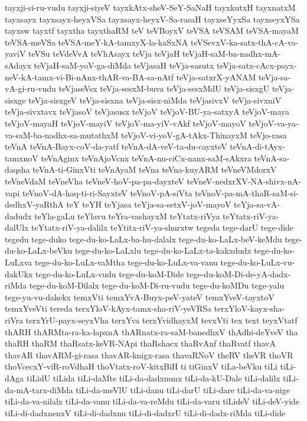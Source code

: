 {tayxji-si-ru-vudu
tayxji-siyeV
tayxkAtx-sheV-SeY-SaNaH
tayxkutxH
tayxnatxM
tayxsayx
tayxsayx-heyxVSa
tayxsayx-heyxV-Sa-rasaH
tayxseYyxSa
tayxseyxYSa
tayxsw
tayxtf
tayxtha
tayxthaRM
teV
teVBoyxV
teVSA
teVSAM
teVSA-mayaM
teVSA-meVSa
teVSA-meY-kA-tamxyX-la-kaSxNA
teVSevxV-ka-satx-thA-cA-va-yaviV
teVSu
teVdeVvA
teVhAsayx
teVja
teVjaH
teVjaH-saM-ba-nadhx-mA-sAdayx
teVjaH-saM-yoV-ga-diMda
teVjasaH
teVja-sasutx
teVja-satx-cAcx-payx-neV-kA-tamx-vi-Bi-nAnx-thAR-va-BA-sa-nAtf
teVja-satxrX-yANAM
teVja-sa-vA-gi-ru-vudu
teVjaseVsx
teVja-sesxM-buva
teVja-sesxMdU
teVja-sisxgU
teVja-sisxge
teVja-sisxgeV
teVja-sisxna
teVja-sisx-niMda
teVjasivxV
teVja-sivxniV
teVja-sivxtavx
teVjasoV
teVjasusx
teVjoV
teVjoV-BU-ya-satxyA
teVjoV-maya
teVjoV-mayaH
teVjoV-mayiV
teVjoV-ma-yiV-vAkf
teVjoV-mayoV
teVjoV-va-ya-va-saM-ba-nadhx-sa-mutathxM
teVjoV-vi-yoV-gA-tAkx-ThinayxM
teVjo-rasa
teVnA
teVnA-Bayx-coV-da-yatf
teVnA-dA-veV-ta-du-cayxteV
teVnA-di-tAyx-tamxnoV
teVnAginx
teVnAjoVcnx
teVnA-nu-ciCx-nanx-saM-sAkxra
teVnA-sa-daqsha
teVnA-ti-GinxVti
teVnAyaM
teVna
teVna-kuyARM
teVneVMdorxV
teVneVdaM
teVneVha
teVneV-hoV-pa-pa-dayxteV
teVneV-nedxrXV-NA-shivx-nA-vapi
teVnoV-dA-haq-ti-ri-SayxteV
teVnoV-pA-siVta
teVnoV-pa-mA-thaR-saM-si-dedhxV-yaRthA
teY
teYH
teYjasa
teYja-sa-setxV-joV-mayoV
teYja-sa-vA-dadudx
teYla-gaLu
teYlavu
teYra-vashayxM
teYtatx-riVya
teYtatx-riV-ya-dalUlx
teYtatx-riV-ya-dalilx
teYtitx-riV-ya-shurxtw
tegeda
tege-darU
tege-dide
tegedu
tege-duko
tege-du-ko-LaLx-ba-hu-dalalx
tege-du-ko-LaLx-beV-keMdu
tege-du-ko-LaLx-beVku
tege-du-ko-LaLxlu
tege-du-ko-LaLx-ta-kakxdudx
tege-du-ko-LuLxva
tege-du-ko-LuLx-vaMtha
tege-du-ko-LuLx-va-vanu
tege-du-ko-LuLx-vu-dakUkx
tege-du-ko-LuLx-vudu
tege-du-koM-Dide
tege-du-koM-Di-de-yA-dadx-riMda
tege-du-koM-Dilalx
tege-du-koM-Di-ru-vudu
tege-du-koMDu
tege-yalu
tege-yu-vu-dakekx
temxVti
temxYvA-Buyx-peV-yateV
temxYveV-tayxtoV
temxYveVti
tereda
terxYloV-kAyx-tamx-sha-riV-yeVRSa
terxYloV-kayx-sha-riVra
terxYrU-payx-seyxVha
terxYva
terxYvidhayxM
tevxVti
tex
text
teyxVtatf
thARH
thARMta-ra-ka-lapxnA
thARnatx-ra-saM-banedhxV
thAdhi-deYveV
tha
thaRH
thaRM
thaRsatx-keVR-NApi
thaRshacx
thaRvAnf
thaRvatf
thavA
thavAR
thavARM-gi-rasa
thavAR-knigx-rasa
thavaRNoV
theRV
theVR
thoVR
thoVcecxY-viR-roVdhaH
thoVtatx-roV-kitxBiH
ti
tiGinxV
tiLa-beVku
tiLi
tiLi-dAga
tiLidU
tiLida
tiLi-daMte
tiLi-da-dadxnunx
tiLi-da-kU-Dale
tiLi-dalilx
tiLi-da-mA-tarx-diMda
tiLi-da-meVlU
tiLi-danu
tiLi-darU
tiLi-dare
tiLi-da-va-nige
tiLi-da-va-nilalx
tiLi-da-vanu
tiLi-da-va-reMdu
tiLi-da-varu
tiLideV
tiLi-deV-yide
tiLi-di-dadxnenxV
tiLi-di-dadxnu
tiLi-di-dadxrU
tiLi-di-dadx-riMda
tiLi-dide
}

